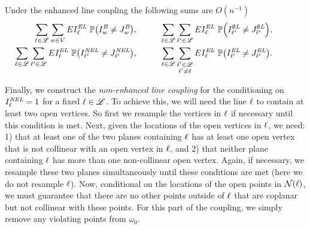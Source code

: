 \begin{lemma}
\label{el-coupling-lem}
Under the enhanced line coupling the following sums are $O(n^{-1})$
\begin{align*}
\sum_{\Ln \in \lineset} \sum_{\vect{w}\in V} E\EL_\Ln\ \prob{\left(\B_{\vect{w}} \neq \JB_{\vect{w}}\right)}, & \hspace{1cm} 
\sum_{\Ln \in \lineset} \sum_{\Ln' \in \lineset} E\EL_\Ln\ \prob{\left(\OL_{\Ln'} \neq \JOL_{\Ln'}\right)},
\hspace{1cm}  \\
\sum_{\Ln \in \lineset} \sum_{\Ln' \in \lineset} E\EL_\Ln\ \prob{\left(\NEL_{\Ln'}\neq \JNEL_{\Ln'}\right)}, &\hspace{1cm} 
\sum_{\Ln \in \lineset} \sum_{\substack{\Ln' \in \lineset\\ \Ln'\neq \Ln}} E\EL_\Ln\ \prob{\left(\EL_{\Ln'} \neq \JEL_{\Ln'}\right)} .
\end{align*}
\end{lemma}

Finally, we construct the {\em non-enhanced line coupling} for the conditioning on $I^{\text{\em NEL}}_\ell = 1$ for a fixed $\ell \in \mathscr{L}$.  To achieve this, we will need the line $\ell$ to contain at least two open vertices.  So first we resample the vertices in $\ell$ if necessary until this condition is met.  Next, given the locations of the open vertices in $\ell$, we need: 1) that at least one of the two planes containing $\ell$ has at least one open vertex that is not collinear with an open vertex in $\ell$, and 2) that neither plane containing $\ell$ has more than one non-collinear open vertex.  Again, if necessary, we resample these two planes simultaneously until these conditions are met (here we do not resample $\ell$).  Now, conditional on the locations of the open points in $\mathcal{N}(\ell)$, we must guarantee that there are no other points outside of $\ell$ that are coplanar but not collinear with these points.  For this part of the coupling, we simply remove any violating points from $\omega_0$.

